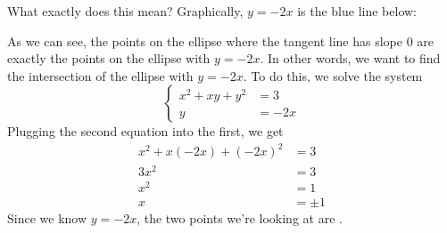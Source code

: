 \documentclass{article}
\begin{document}
\begin{enumerate}
\begin{enumerate}
\begin{solution}
      What exactly does this mean?  Graphically, $y = -2x$ is the blue
      line below:
      \begin{center}
      \end{center}
      As we can see, the points on the ellipse where the tangent line has
      slope $0$ are exactly the points on the ellipse with $y = -2x$.  In
      other words, we want to find the intersection of the ellipse with $y
      = -2x$.  To do this, we solve the system
      \[ \left\{
        \begin{aligned}
          x^2 + xy + y^2 &= 3 \\
          y &= -2x 
        \end{aligned} \right.\]
      Plugging the second equation into the first, we get
      \begin{align*}
        x^2 + x (-2x) + (-2x)^2 &= 3 \\
        3x^2 &= 3 \\
        x^2 &= 1 \\
        x &= \pm 1
      \end{align*}
      Since we know $y = -2x$, the two points we're looking at are
      .
    \end{solution}

  \end{enumerate}



\end{enumerate}
\end{document}
